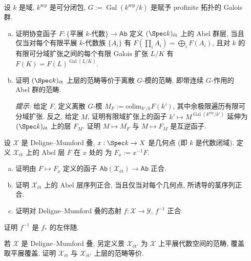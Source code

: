 \begin{exercise}\label{src:5.1.9}
设 $k$ 是域, $k^{\mathrm{sep}}$ 是可分闭包, $G:=\operatorname{Gal}(k^{\mathrm{sep}}/k)$ 是赋予 profinite 拓扑的 Galois 群.
\begin{enumerate}[(a)]
\item 证明协变函子 $F:\{\text{平展 $k$-代数}\}\to\mathsf{Ab}$ 定义 $(\Spec k)_{\text{ét}}$ 上的 Abel 群层, 当且仅当对每个有限平展 $k$-代数族 $\{A_i\}$ 有 $F(\prod_i A_i)=\bigoplus_i F(A_i)$, 且对 $k$ 的有限可分域扩张之间的每个有限 Galois 扩张 $L/K$ 有 $F(K)=F(L)^{\operatorname{Gal}(L/K)}$.
\item 证明 $(\Spec k)_{\text{ét}}$ 上层的范畴等价于离散 $G$-模的范畴, 即带连续 $G$-作用的 Abel 群的范畴.

\textit{提示:} 给定 $F$, 定义离散 $G$-模 $M_F:=\mathrm{colim}_{k'/k}F(k')$, 其中余极限遍历有限可分域扩张. 反之, 给定 $M$, 证明有限域扩张上的函子 $k'\mapsto M^{\operatorname{Gal}(k^{\mathrm{sep}}/k')}$ 延伸为 $(\Spec k)_{\text{ét}}$ 上的层 $F_M$. 证明 $M\mapsto M_F$ 与 $M\mapsto F_M$ 是互逆函子.
\end{enumerate}
\end{exercise}
\newpage
\begin{exercise}\label{src:5.1.10}
设 $\mathcal X$ 是 Deligne--Mumford 叠, $x:\Spec k\to\mathcal X$ 是几何点 (即 $k$ 是代数闭域). 定义 $\mathcal X_{\text{ét}}$ 上的 Abel 层 $F$ 在 $x$ 处的 为 $F_x:=x^{-1}F$.
\begin{enumerate}[(a)]
\item 证明由 $F\mapsto F_x$ 定义的函子 $\mathsf{Ab}(\mathcal X_{\text{ét}})\to\mathsf{Ab}$ 正合.
\item 证明 $\mathcal X_{\text{ét}}$ 上的 Abel 层序列正合, 当且仅当对每个几何点, 所诱导的茎序列正合.
\item 证明对 Deligne--Mumford 叠的态射 $f:\mathcal X\to\mathcal Y$, $f^{-1}$ 正合.
\end{enumerate}
\end{exercise}
\begin{exercise}[细节]\label{src:5.1.11}
证明 $f^{-1}$ 是 $f_*$ 的左伴随.
\end{exercise}
\begin{exercise}[技术性]\label{src:5.1.12}
若 $\mathcal X$ 是 Deligne--Mumford 叠, 另定义景 $\mathcal X_{\text{ét}'}$ 为 $\mathcal X$ 上平展代数空间的范畴, 覆盖取平展覆盖. 证明 $\mathcal X_{\text{ét}}$ 与 $\mathcal X_{\text{ét}'}$ 上层的范畴等价.
\end{exercise}

